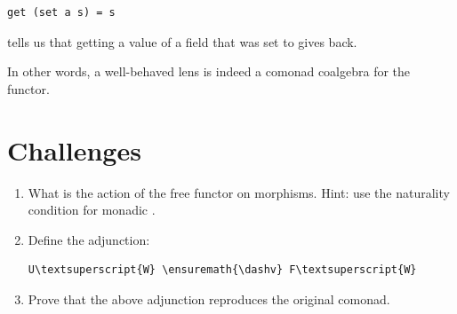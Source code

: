 \begin{Verbatim}[commandchars=\\\{\}]
get (set a s) = s
\end{Verbatim}
tells us that getting a value of a field that was set to 
gives  back.

In other words, a well-behaved lens is indeed a comonad coalgebra for
the  functor.

\section{Challenges}\label{challenges}

\begin{enumerate}
\tightlist
\item
  What is the action of the free functor
   on morphisms. Hint: use the
  naturality condition for monadic .
\item
  Define the adjunction:

  \begin{Verbatim}[commandchars=\\\{\}]
U\textsuperscript{W} \ensuremath{\dashv} F\textsuperscript{W}
\end{Verbatim}
\item
  Prove that the above adjunction reproduces the original comonad.
\end{enumerate}
